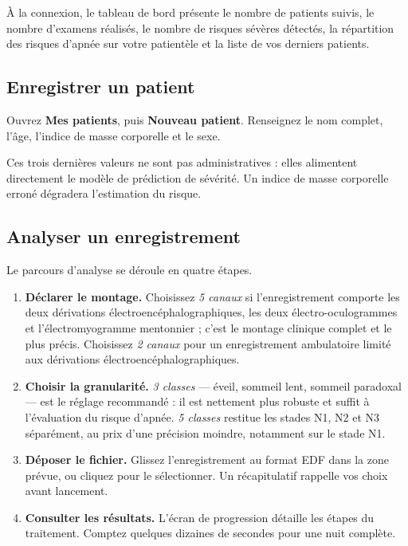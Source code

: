 À la connexion, le tableau de bord présente le nombre de patients suivis, le nombre
d'examens réalisés, le nombre de risques sévères détectés, la répartition des risques
d'apnée sur votre patientèle et la liste de vos derniers patients.

\subsection*{Enregistrer un patient}

Ouvrez \textbf{Mes patients}, puis \textbf{Nouveau patient}. Renseignez le nom complet,
l'âge, l'indice de masse corporelle et le sexe.

Ces trois dernières valeurs ne sont pas administratives : elles alimentent directement
le modèle de prédiction de sévérité. Un indice de masse corporelle erroné dégradera
l'estimation du risque.

\subsection*{Analyser un enregistrement}

Le parcours d'analyse se déroule en quatre étapes.

\begin{enumerate}[itemsep=3pt,topsep=4pt]
  \item \textbf{Déclarer le montage.} Choisissez \emph{5 canaux} si l'enregistrement
        comporte les deux dérivations électroencéphalographiques, les deux
        électro-oculogrammes et l'électromyogramme mentonnier ; c'est le montage
        clinique complet et le plus précis. Choisissez \emph{2 canaux} pour un
        enregistrement ambulatoire limité aux dérivations
        électroencéphalographiques.
  \item \textbf{Choisir la granularité.} \emph{3 classes} — éveil, sommeil lent,
        sommeil paradoxal — est le réglage recommandé : il est nettement plus robuste
        et suffit à l'évaluation du risque d'apnée. \emph{5 classes} restitue les
        stades N1, N2 et N3 séparément, au prix d'une précision moindre, notamment sur
        le stade N1.
  \item \textbf{Déposer le fichier.} Glissez l'enregistrement au format EDF dans la
        zone prévue, ou cliquez pour le sélectionner. Un récapitulatif rappelle vos
        choix avant lancement.
  \item \textbf{Consulter les résultats.} L'écran de progression détaille les étapes du
        traitement. Comptez quelques dizaines de secondes pour une nuit complète.
\end{enumerate}

